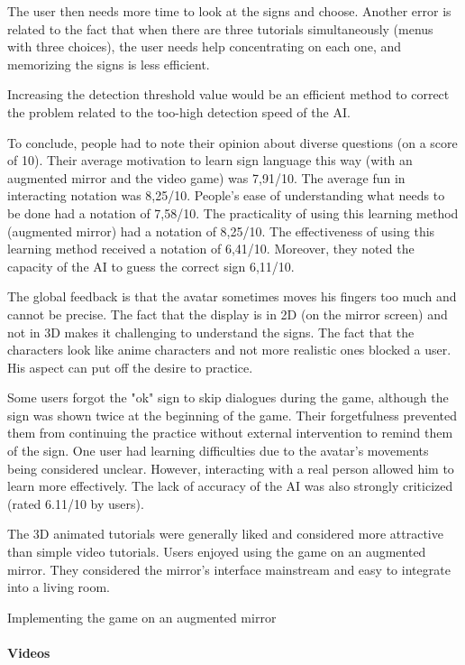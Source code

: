The user then needs more time to look at the signs and choose. Another error is related to the fact that when there are three tutorials simultaneously (menus with three choices), the user needs help concentrating on each one, and memorizing the signs is less efficient.

Increasing the detection threshold value would be an efficient method to correct the problem related to the too-high detection speed of the AI.

To conclude, people had to note their opinion about diverse questions (on a score of 10). Their average motivation to learn sign language this way (with an augmented mirror and the video game) was 7,91/10.
The average fun in interacting notation was 8,25/10. People's ease of understanding what needs to be done had a notation of 7,58/10. The practicality of using this learning method (augmented mirror) had a notation of 8,25/10. The effectiveness of using this learning method received a notation of 6,41/10. Moreover, they noted the capacity of the AI to guess the correct sign 6,11/10.

The global feedback is that the avatar sometimes moves his fingers too much and cannot be precise. The fact that the display is in 2D (on the mirror screen) and not in 3D makes it challenging to understand the signs.
The fact that the characters look like anime characters and not more realistic ones blocked a user. His aspect can put off the desire to practice.

Some users forgot the "ok" sign to skip dialogues during the game, although the sign was shown twice at the beginning of the game. Their forgetfulness prevented them from continuing the practice without external intervention to remind them of the sign. 
One user had learning difficulties due to the avatar's movements being considered unclear. However, interacting with a real person allowed him to learn more effectively. The lack of accuracy of the AI was also strongly criticized (rated 6.11/10 by users). 

The 3D animated tutorials were generally liked and considered more attractive than simple video tutorials. Users enjoyed using the game on an augmented mirror. They considered the mirror's interface mainstream and easy to integrate into a living room.

Implementing the game on an augmented mirror


\paragraph{Videos}

